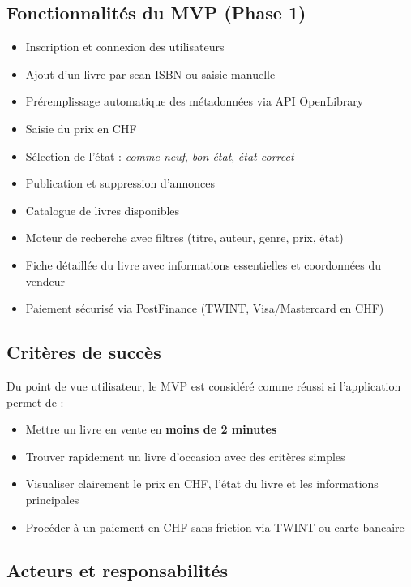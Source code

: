 \documentclass[12pt, a4paper]{report}
\renewcommand{\_}{\origunderscore\allowbreak}
\begin{document}
\subsection{Fonctionnalités du MVP (Phase 1)}

\begin{itemize}
    \item Inscription et connexion des utilisateurs
    \item Ajout d'un livre par scan ISBN ou saisie manuelle
    \item Préremplissage automatique des métadonnées via API OpenLibrary
    \item Saisie du prix en CHF
    \item Sélection de l'état : \textit{comme neuf}, \textit{bon état}, \textit{état correct}
    \item Publication et suppression d'annonces
    \item Catalogue de livres disponibles
    \item Moteur de recherche avec filtres (titre, auteur, genre, prix, état)
    \item Fiche détaillée du livre avec informations essentielles et coordonnées du vendeur
    \item Paiement sécurisé via PostFinance (TWINT, Visa/Mastercard en CHF)
\end{itemize}

\subsection{Critères de succès}

Du point de vue utilisateur, le MVP est considéré comme réussi si l'application permet de :
\begin{itemize}
    \item Mettre un livre en vente en \textbf{moins de 2 minutes}
    \item Trouver rapidement un livre d'occasion avec des critères simples
    \item Visualiser clairement le prix en CHF, l'état du livre et les informations principales
    \item Procéder à un paiement en CHF sans friction via TWINT ou carte bancaire
\end{itemize}

\subsection{Acteurs et responsabilités}
\end{document}
